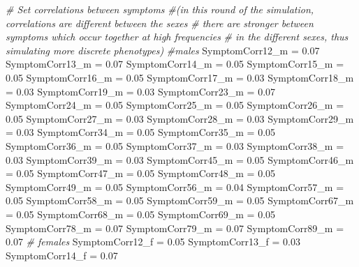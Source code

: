 \documentclass[]{article}
\newenvironment{Shaded}{\begin{snugshade}}{\end{snugshade}}
\newcommand{\FloatTok}[1]{\textcolor[rgb]{0.00,0.00,0.81}{#1}}
\newcommand{\StringTok}[1]{\textcolor[rgb]{0.31,0.60,0.02}{#1}}
\newcommand{\CommentTok}[1]{\textcolor[rgb]{0.56,0.35,0.01}{\textit{#1}}}
\newcommand{\NormalTok}[1]{#1}
\begin{document}
\begin{Shaded}
\begin{Highlighting}[]
\CommentTok{# Set correlations between symptoms}
\CommentTok{#(in this round of the simulation, correlations are different between the sexes}
\CommentTok{# there are stronger between symptoms which occur together at high frequencies}
\CommentTok{# in the different sexes, thus simulating more discrete phenotypes)}
\CommentTok{#males}
\NormalTok{SymptomCorr12_m =}\StringTok{ }\FloatTok{0.07}
\NormalTok{SymptomCorr13_m =}\StringTok{ }\FloatTok{0.07}
\NormalTok{SymptomCorr14_m =}\StringTok{ }\FloatTok{0.05}
\NormalTok{SymptomCorr15_m =}\StringTok{ }\FloatTok{0.05}
\NormalTok{SymptomCorr16_m =}\StringTok{ }\FloatTok{0.05}
\NormalTok{SymptomCorr17_m =}\StringTok{ }\FloatTok{0.03}
\NormalTok{SymptomCorr18_m =}\StringTok{ }\FloatTok{0.03}
\NormalTok{SymptomCorr19_m =}\StringTok{ }\FloatTok{0.03}
\NormalTok{SymptomCorr23_m =}\StringTok{ }\FloatTok{0.07}
\NormalTok{SymptomCorr24_m =}\StringTok{ }\FloatTok{0.05}
\NormalTok{SymptomCorr25_m =}\StringTok{ }\FloatTok{0.05}
\NormalTok{SymptomCorr26_m =}\StringTok{ }\FloatTok{0.05}
\NormalTok{SymptomCorr27_m =}\StringTok{ }\FloatTok{0.03}
\NormalTok{SymptomCorr28_m =}\StringTok{ }\FloatTok{0.03}
\NormalTok{SymptomCorr29_m =}\StringTok{ }\FloatTok{0.03}
\NormalTok{SymptomCorr34_m =}\StringTok{ }\FloatTok{0.05}
\NormalTok{SymptomCorr35_m =}\StringTok{ }\FloatTok{0.05}
\NormalTok{SymptomCorr36_m =}\StringTok{ }\FloatTok{0.05}
\NormalTok{SymptomCorr37_m =}\StringTok{ }\FloatTok{0.03}
\NormalTok{SymptomCorr38_m =}\StringTok{ }\FloatTok{0.03}
\NormalTok{SymptomCorr39_m =}\StringTok{ }\FloatTok{0.03}
\NormalTok{SymptomCorr45_m =}\StringTok{ }\FloatTok{0.05}
\NormalTok{SymptomCorr46_m =}\StringTok{ }\FloatTok{0.05}
\NormalTok{SymptomCorr47_m =}\StringTok{ }\FloatTok{0.05}
\NormalTok{SymptomCorr48_m =}\StringTok{ }\FloatTok{0.05}
\NormalTok{SymptomCorr49_m =}\StringTok{ }\FloatTok{0.05}
\NormalTok{SymptomCorr56_m =}\StringTok{ }\FloatTok{0.04}
\NormalTok{SymptomCorr57_m =}\StringTok{ }\FloatTok{0.05}
\NormalTok{SymptomCorr58_m =}\StringTok{ }\FloatTok{0.05}
\NormalTok{SymptomCorr59_m =}\StringTok{ }\FloatTok{0.05}
\NormalTok{SymptomCorr67_m =}\StringTok{ }\FloatTok{0.05}
\NormalTok{SymptomCorr68_m =}\StringTok{ }\FloatTok{0.05}
\NormalTok{SymptomCorr69_m =}\StringTok{ }\FloatTok{0.05}
\NormalTok{SymptomCorr78_m =}\StringTok{ }\FloatTok{0.07}
\NormalTok{SymptomCorr79_m =}\StringTok{ }\FloatTok{0.07}
\NormalTok{SymptomCorr89_m =}\StringTok{ }\FloatTok{0.07}
\CommentTok{# females}
\NormalTok{SymptomCorr12_f =}\StringTok{ }\FloatTok{0.05}
\NormalTok{SymptomCorr13_f =}\StringTok{ }\FloatTok{0.03}
\NormalTok{SymptomCorr14_f =}\StringTok{ }\FloatTok{0.07}

\end{Highlighting}
\end{Shaded}
\end{document}
